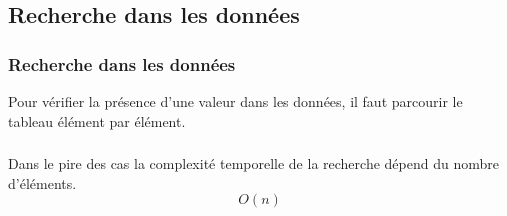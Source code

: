 \documentclass[svgnames,11pt]{beamer}
\begin{document}
\subsection{Recherche dans les données}
\begin{frame}
    \frametitle{Recherche dans les données}

    Pour vérifier la présence d'une valeur dans les données, il faut parcourir le tableau élément par élément.
\begin{center}
\end{center}

\end{frame}

\begin{frame}
    \frametitle{}

    \begin{aretenir}[]
        Dans le pire des cas la complexité temporelle de la recherche dépend du nombre d'éléments.
        $$O(n)$$
        \end{aretenir}
\end{frame}
\end{document}

